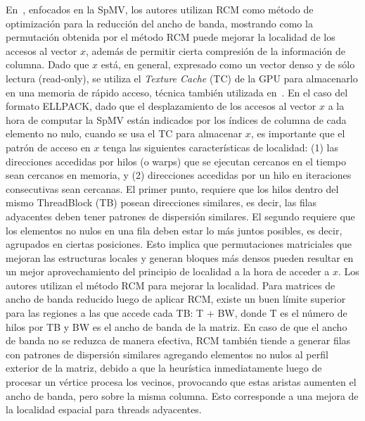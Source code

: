 En~\cite{Xu2010}, enfocados en la SpMV, los autores utilizan RCM como método de optimización para la reducción del ancho de banda, %
mostrando como la permutación obtenida por el método RCM puede mejorar la localidad de los accesos al vector $x$, además de permitir cierta compresión de la información de columna. 
Dado que $x$ está, en general, expresado como un vector denso y de sólo lectura (read-only), se utiliza el \textit{Texture Cache} (TC) de la GPU para almacenarlo en una memoria de rápido acceso, técnica también utilizada en~\cite{Bell2009,GarlandAndBell2009,Choi2010}.
En el caso del formato ELLPACK, dado que el desplazamiento de los accesos al vector $x$  a la hora de computar la SpMV están indicados por los índices de columna de cada elemento no nulo,  cuando se usa el TC para almacenar $x$, es importante que el patrón de acceso en $x$ tenga las siguientes características de localidad: (1) las direcciones accedidas por hilos (o warps) que se ejecutan cercanos en el tiempo sean cercanos en memoria, y (2) direcciones accedidas por un hilo en iteraciones consecutivas sean cercanas. El primer punto, requiere que los hilos dentro del mismo ThreadBlock (TB) posean direcciones similares, es decir, las filas adyacentes deben tener patrones de dispersión similares. El segundo requiere que los elementos no nulos en una fila deben estar lo más juntos posibles, es decir, agrupados en ciertas posiciones. Esto implica que permutaciones matriciales que mejoran las estructuras locales y generan bloques más densos pueden resultar en un mejor aprovechamiento del principio de localidad a la hora de acceder a $x$. Los autores utilizan el método RCM para mejorar la localidad. Para matrices de ancho de banda reducido luego de aplicar RCM, existe un buen límite superior para las regiones a las que accede cada TB: T + BW, donde T es el número de hilos por TB y BW es el ancho de banda de la matriz. En caso de que el ancho de banda no se reduzca de manera efectiva, RCM también tiende a generar filas con patrones de dispersión similares agregando elementos no nulos al perfil exterior de la matriz, debido a que la heurística inmediatamente luego de procesar un vértice procesa los vecinos, provocando que estas aristas aumenten el ancho de banda, pero sobre la misma columna. Esto corresponde a una mejora de la localidad espacial para threads adyacentes.


